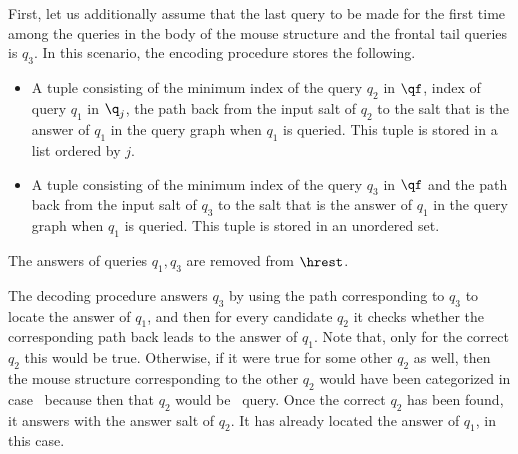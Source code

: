 {
First, let us additionally assume that the last query to be made for the first time among the queries in the body of the mouse structure and the frontal tail queries is $q_3$.
In this scenario, the encoding procedure stores the following.
\begin{itemize}
  \item A tuple consisting of the minimum index of the query $q_2$ in $\qf$, index of query $q_1$ in $\q_j$, the path back from the input salt of $q_2$ to the salt that is the answer of $q_1$ in the query graph when $q_1$ is queried. This tuple is stored in a list ordered by $j$.
  \item A tuple consisting of the minimum index of the query $q_3$ in $\qf$ and the path back from the input salt of $q_3$ to the salt that is the answer of $q_1$ in the query graph when $q_1$ is queried. This tuple is stored in an unordered set.
\end{itemize}
The answers of queries $q_1,q_3$ are removed from $\hrest$.
 
 The decoding procedure answers $q_3$ by using the path corresponding to $q_3$ to locate the answer of $q_1$, and then for every candidate $q_2$ it checks whether the corresponding path back leads to the answer of $q_1$. Note that, only for the correct $q_2$ this would be true. Otherwise, if it were true for some other $q_2$ as well, then the mouse structure corresponding to the other $q_2$ would have been categorized in case~ because then that $q_2$ would be \frep\ query.
 Once the correct $q_2$ has been found, it answers with the answer salt of $q_2$. It has already located the answer of $q_1$, in this case.

}
